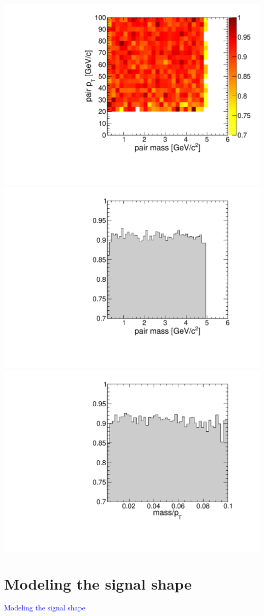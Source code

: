 \documentclass[compress]{beamer}
\begin{document}
\begin{frame}
\includegraphics[width=0.32\linewidth]{eff_trigger_inplateau_masspt.pdf}
\includegraphics[width=0.32\linewidth]{eff_trigger_inplateau_massonly.pdf}
\includegraphics[width=0.32\linewidth]{eff_trigger_inplateau_oneovergamma.pdf}
\end{frame}

\section*{Modeling the signal shape}
\begin{frame}
\begin{center}
\Huge \textcolor{blue}{Modeling the signal shape}
\end{center}
\end{frame}
\end{document}
